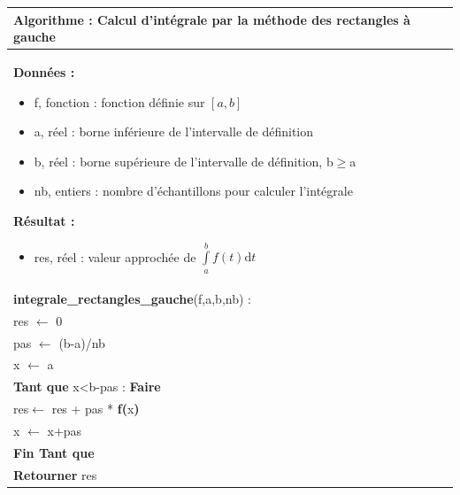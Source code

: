 \documentclass[10pt]{article}
\begin{document}
\begin{pseudo}
\begin{center}
\begin{tabular}{p{}}
\hline
\textbf{Algorithme :} Calcul d'intégrale par la méthode des rectangles à gauche\\
\hline
\textbf{Données :}
\begin{itemize}
\item \textsf{f}, fonction : fonction définie sur $[a,b]$  
\item \textsf{a}, réel : borne inférieure de l'intervalle de définition
\item \textsf{b}, réel : borne supérieure de l'intervalle de définition, \textsf{b$\geq$a}
\item \textsf{nb}, entiers : nombre d'échantillons pour calculer l'intégrale
\end{itemize}
\textbf{Résultat :} 
\begin{itemize}
\item \textsf{res}, réel : valeur approchée de $\int\limits_a^b f(t)\text{d}t$
\end{itemize}
\\
\textbf{integrale\_rectangles\_gauche}(\textsf{f,a,b,nb}) :\\
\hspace{.4cm}\textsf{res} $\leftarrow$ \textsf{0}\\
\hspace{.4cm}\textsf{pas} $\leftarrow$ \textsf{(b-a)/nb}\\
\hspace{.4cm}\textsf{x} $\leftarrow$ \textsf{a}\\
\hspace{.4cm}\textbf{Tant que} \textsf{x<b-pas} : \textbf{Faire}\\
\hspace{.8cm}\textsf{res}$\leftarrow$ \textsf{res + pas *} \textbf{f(}\textsf{x}\textbf{)}\\
\hspace{.8cm}\textsf{x} $\leftarrow$ \textsf{x+pas}\\
\hspace{.4cm}\textbf{Fin Tant que} \\
\hspace{.4cm}\textbf{Retourner} \textsf{res}\\
\hline
\end{tabular}
\end{center}
\end{pseudo}
\end{document}
